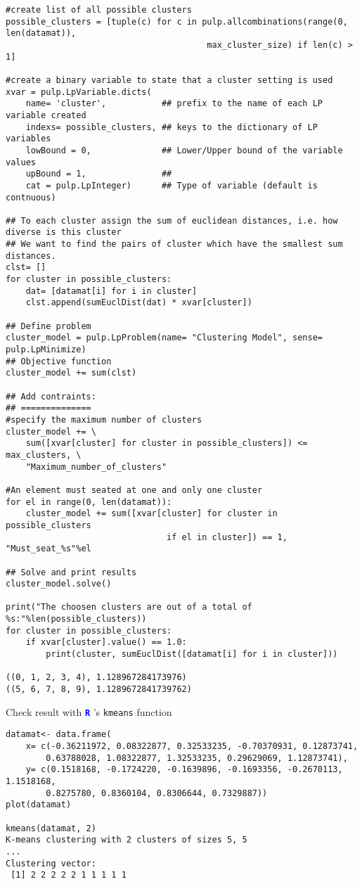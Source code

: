 \documentclass[a4paper]{article}
\newcommand{\R}{\textbf{\texttt{\textcolor{Blue}{R}} }}
\begin{document}
\begin{verbatim}
#create list of all possible clusters
possible_clusters = [tuple(c) for c in pulp.allcombinations(range(0, len(datamat)),
                                        max_cluster_size) if len(c) > 1]

#create a binary variable to state that a cluster setting is used
xvar = pulp.LpVariable.dicts(
    name= 'cluster',           ## prefix to the name of each LP variable created
    indexs= possible_clusters, ## keys to the dictionary of LP variables
    lowBound = 0,              ## Lower/Upper bound of the variable values
    upBound = 1,               ## 
    cat = pulp.LpInteger)      ## Type of variable (default is contnuous)

## To each cluster assign the sum of euclidean distances, i.e. how diverse is this cluster
## We want to find the pairs of cluster which have the smallest sum distances.
clst= []
for cluster in possible_clusters:
    dat= [datamat[i] for i in cluster]
    clst.append(sumEuclDist(dat) * xvar[cluster])

## Define problem
cluster_model = pulp.LpProblem(name= "Clustering Model", sense= pulp.LpMinimize)
## Objective function 
cluster_model += sum(clst)

## Add contraints:
## ==============
#specify the maximum number of clusters
cluster_model += \
    sum([xvar[cluster] for cluster in possible_clusters]) <= max_clusters, \
    "Maximum_number_of_clusters"

#An element must seated at one and only one cluster
for el in range(0, len(datamat)):
    cluster_model += sum([xvar[cluster] for cluster in possible_clusters
                                if el in cluster]) == 1, "Must_seat_%s"%el

## Solve and print results
cluster_model.solve()

print("The choosen clusters are out of a total of %s:"%len(possible_clusters))
for cluster in possible_clusters:
    if xvar[cluster].value() == 1.0:
        print(cluster, sumEuclDist([datamat[i] for i in cluster]))

((0, 1, 2, 3, 4), 1.128967284173976)
((5, 6, 7, 8, 9), 1.1289672841739762)
\end{verbatim}

Check result with \R's \texttt{kmeans} function

\begin{verbatim}
datamat<- data.frame(
    x= c(-0.36211972, 0.08322877, 0.32533235, -0.70370931, 0.12873741,
        0.63788028, 1.08322877, 1.32533235, 0.29629069, 1.12873741),
    y= c(0.1518168, -0.1724220, -0.1639896, -0.1693356, -0.2670113, 1.1518168,
        0.8275780, 0.8360104, 0.8306644, 0.7329887))
plot(datamat)

kmeans(datamat, 2)
K-means clustering with 2 clusters of sizes 5, 5
...
Clustering vector:
 [1] 2 2 2 2 2 1 1 1 1 1
\end{verbatim}
\end{document}
